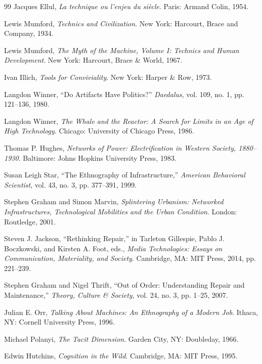 \documentclass[11pt,oneside]{book}
\theoremstyle{definition}
\theoremstyle{remark}
\begin{document}
\begin{thebibliography}{99}
 Jacques Ellul, \emph{La technique ou l'enjeu du si\`ecle}. Paris: Armand Colin, 1954.

 Lewis Mumford, \emph{Technics and Civilization}. New York: Harcourt, Brace and Company, 1934.

 Lewis Mumford, \emph{The Myth of the Machine, Volume I: Technics and Human Development}. New
  York: Harcourt, Brace \& World, 1967.

 Ivan Illich, \emph{Tools for Conviviality}. New York: Harper \& Row, 1973.

 Langdon Winner, ``Do Artifacts Have Politics?'' \emph{Daedalus}, vol. 109, no. 1, pp. 121--136,
  1980.

 Langdon Winner, \emph{The Whale and the Reactor: A Search for Limits in an Age of High
  Technology}. Chicago: University of Chicago Press, 1986.

 Thomas P. Hughes, \emph{Networks of Power: Electrification in Western Society, 1880--1930}.
  Baltimore: Johns Hopkins University Press, 1983.

 Susan Leigh Star, ``The Ethnography of Infrastructure,'' \emph{American Behavioral Scientist},
  vol. 43, no. 3, pp. 377--391, 1999.

 Stephen Graham and Simon Marvin, \emph{Splintering Urbanism: Networked Infrastructures,
  Technological Mobilities and the Urban Condition}. London: Routledge, 2001.

 Steven J. Jackson, ``Rethinking Repair,'' in Tarleton Gillespie, Pablo J. Boczkowski, and
  Kirsten A. Foot, eds., \emph{Media Technologies: Essays on Communication, Materiality, and
  Society}. Cambridge, MA: MIT Press, 2014, pp. 221--239.

 Stephen Graham and Nigel Thrift, ``Out of Order: Understanding Repair and Maintenance,''
  \emph{Theory, Culture \& Society}, vol. 24, no. 3, pp. 1--25, 2007.

 Julian E. Orr, \emph{Talking About Machines: An Ethnography of a Modern Job}. Ithaca, NY:
  Cornell University Press, 1996.

 Michael Polanyi, \emph{The Tacit Dimension}. Garden City, NY: Doubleday, 1966.

 Edwin Hutchins, \emph{Cognition in the Wild}. Cambridge, MA: MIT Press, 1995.


\end{thebibliography}
\end{document}
